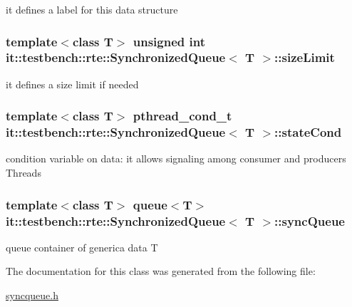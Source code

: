 it defines a label for this data structure \hypertarget{classit_1_1testbench_1_1rte_1_1SynchronizedQueue_a100815b13dc7f2ca1e75d40f0b036258}{
\subsubsection[{size\-Limit}]{\setlength{\rightskip}{0pt plus 5cm}template$<$class T$>$ unsigned int {\bf it\-::testbench\-::rte\-::\-Synchronized\-Queue}$<$ T $>$\-::size\-Limit\hspace{0.3cm}{\ttfamily [protected]}}}\label{d6/dec/classit_1_1testbench_1_1rte_1_1SynchronizedQueue_a100815b13dc7f2ca1e75d40f0b036258}
it defines a size limit if needed \hypertarget{classit_1_1testbench_1_1rte_1_1SynchronizedQueue_a52beabff3eff970d293a784b8f710c93}{
\subsubsection[{state\-Cond}]{\setlength{\rightskip}{0pt plus 5cm}template$<$class T$>$ pthread\-\_\-cond\-\_\-t {\bf it\-::testbench\-::rte\-::\-Synchronized\-Queue}$<$ T $>$\-::state\-Cond\hspace{0.3cm}{\ttfamily [protected]}}}\label{d6/dec/classit_1_1testbench_1_1rte_1_1SynchronizedQueue_a52beabff3eff970d293a784b8f710c93}
condition variable on data\-: it allows signaling among consumer and producers Threads \hypertarget{classit_1_1testbench_1_1rte_1_1SynchronizedQueue_a3f760daa0238c1c3a9983bfc75c141ad}{
\subsubsection[{sync\-Queue}]{\setlength{\rightskip}{0pt plus 5cm}template$<$class T$>$ queue$<$T$>$ {\bf it\-::testbench\-::rte\-::\-Synchronized\-Queue}$<$ T $>$\-::sync\-Queue\hspace{0.3cm}{\ttfamily [protected]}}}\label{d6/dec/classit_1_1testbench_1_1rte_1_1SynchronizedQueue_a3f760daa0238c1c3a9983bfc75c141ad}
queue container of generica data T 

The documentation for this class was generated from the following file\-:\begin{DoxyCompactItemize}
\item 
\hyperlink{syncqueue_8h}{syncqueue.\-h}\end{DoxyCompactItemize}
